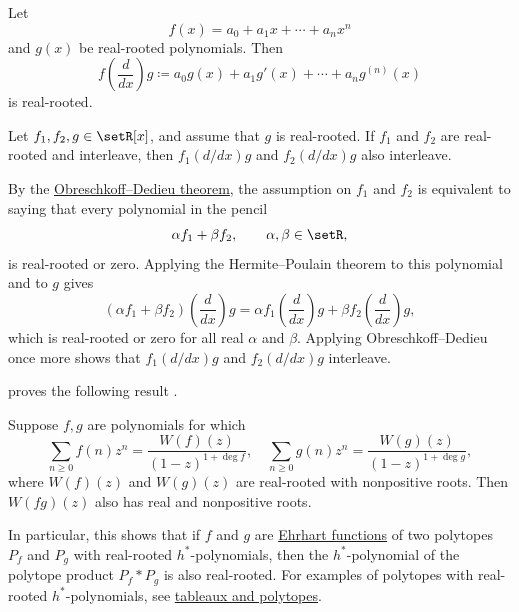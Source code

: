 \begin{theorem}
\label{hermitePoulainTheorem}
Let
\[
  f(x)=a_0+a_1x+\dotsb+a_nx^n
\]
and $g(x)$ be real-rooted polynomials.  Then
\[
  f\!\left(\frac{d}{dx}\right)g
  \coloneqq
  a_0g(x)+a_1g'(x)+\dotsb+a_ng^{(n)}(x)
\]
is real-rooted.
\end{theorem}

\begin{corollary}
\label{hermitePoulainInterlacing}
Let $f_1,f_2,g\in\setR[x]$, and assume that $g$ is real-rooted.
If $f_1$ and $f_2$ are real-rooted and interleave, then
$f_1(d/dx)g$ and $f_2(d/dx)g$ also interleave.
\end{corollary}
\begin{proof*}
By the \hyperref[obreschkoffDedieu]{Obreschkoff--Dedieu theorem}, the
assumption on $f_1$ and $f_2$ is equivalent to saying that every polynomial
in the pencil
\[
  \alpha f_1+\beta f_2,\qquad \alpha,\beta\in\setR,
\]
is real-rooted or zero.  Applying the Hermite--Poulain theorem to this
polynomial and to $g$ gives
\[
  (\alpha f_1+\beta f_2)\!\left(\frac{d}{dx}\right)g
  =
  \alpha f_1\!\left(\frac{d}{dx}\right)g
  +\beta f_2\!\left(\frac{d}{dx}\right)g,
\]
which is real-rooted or zero for all real $\alpha$ and $\beta$.
Applying Obreschkoff--Dedieu once more shows that
$f_1(d/dx)g$ and $f_2(d/dx)g$ interleave.
\end{proof*}

 proves the following result
\cite{Wagner1992}.
\begin{theorem}
Suppose $f,g$ are polynomials for which
\[
 \sum_{n \geq 0} f(n) z^n = \frac{W(f)(z)}{(1-z)^{1+\deg f}}, \quad
 \sum_{n \geq 0} g(n) z^n = \frac{W(g)(z)}{(1-z)^{1+\deg g}},
\]
where $W(f)(z)$ and $W(g)(z)$ are real-rooted with nonpositive roots.
Then $W(fg)(z)$ also has real and nonpositive roots.
\end{theorem}
In particular, this shows that if $f$ and $g$ are
\hyperref[ehrhart]{Ehrhart functions} of two polytopes $P_f$ and $P_g$
with real-rooted $h^*$-polynomials, then the $h^*$-polynomial of the polytope
product $P_f * P_g$ is also real-rooted.
For examples of polytopes with real-rooted $h^*$-polynomials, see
\hyperref[realRootedTableaux]{tableaux and polytopes}.




